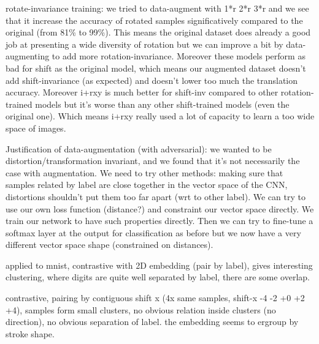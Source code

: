 \documentclass[a4paper,12pt]{article}
\begin{document}
rotate-invariance training: we tried to data-augment with 1*r 2*r 3*r and we see that it increase the accuracy of rotated samples significatively compared to the original (from 81\% to 99\%). This means the original dataset does already a good job at presenting a wide diversity of rotation but we can improve a bit by data-augmenting to add more rotation-invariance.
Moreover these models perform as bad for shift as the original model, which means our augmented dataset doesn't add shift-invariance (as expected) and doesn't lower too much the translation accuracy.
Moreover i+rxy is much better for shift-inv compared to other rotation-trained models but it's worse than any other shift-trained models (even the original one). Which means i+rxy really used a lot of capacity to learn a too wide space of images.

Justification of data-augmentation (with adversarial): we wanted to be distortion/transformation invariant, and we found that it's not necessarily the case with augmentation. We need to try other methods: making sure that samples related by label are close together in the vector space of the CNN, distortions shouldn't put them too far apart (wrt to other label). We can try to use our own loss function (distance?) and constraint our vector space directly.
We train our network to have such properties directly. Then we can try to fine-tune a softmax layer at the output for classification as before but we now have a very different vector space shape (constrained on distances).

applied to mnist, contrastive with 2D embedding (pair by label), gives interesting clustering, where digits are quite well separated by label, there are some overlap.

contrastive, pairing by contiguous shift x (4x same samples, shift-x -4 -2 +0 +2 +4), samples form small clusters, no obvious relation inside clusters (no direction), no obvious separation of label. the embedding seems to ergroup by stroke shape.
\end{document}
